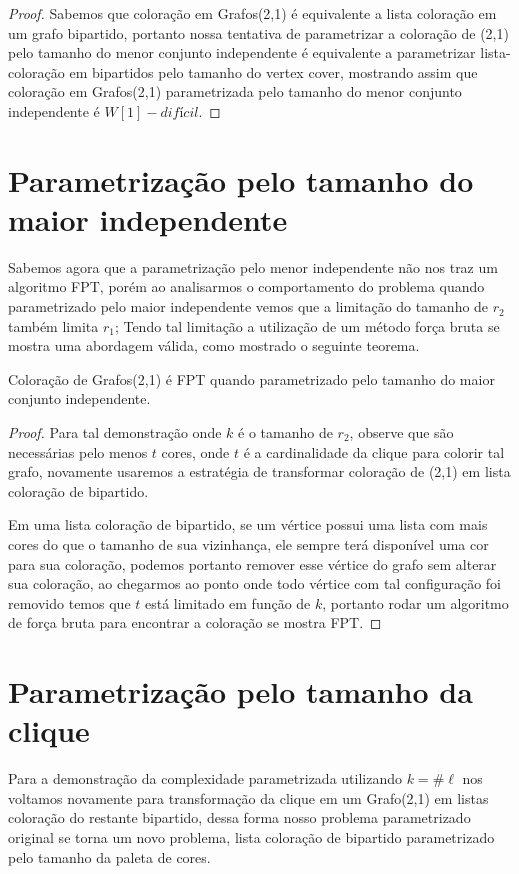 \begin{proof}
	Sabemos que coloração em Grafos(2,1) é equivalente a lista coloração em um grafo bipartido, portanto nossa tentativa de parametrizar a coloração de (2,1) pelo tamanho do menor conjunto independente é equivalente a parametrizar lista-coloração em bipartidos pelo tamanho do vertex cover, mostrando assim que coloração em Grafos(2,1) parametrizada pelo tamanho do menor conjunto independente é $W[1]-difícil$. 
	
\end{proof}

\section{Parametrização pelo tamanho do maior independente}

 Sabemos agora que a parametrização pelo menor independente não nos traz um algoritmo FPT, porém ao analisarmos o comportamento do problema quando parametrizado pelo maior independente vemos que a limitação do tamanho de $r_2$ também limita $r_1$; Tendo tal limitação a utilização de um método força bruta se mostra uma abordagem válida, como mostrado o seguinte teorema.
\begin{teorema}
  Coloração de Grafos(2,1) é FPT quando parametrizado pelo tamanho do maior conjunto independente.
\end{teorema}
\begin{proof}
  Para tal demonstração onde $k$ é o tamanho de $r_2$, observe que são necessárias pelo menos $t$ cores, onde $t$ é a cardinalidade da clique para colorir tal grafo, novamente usaremos a estratégia de transformar coloração de (2,1) em lista coloração de bipartido.
  
  Em uma lista coloração de bipartido, se um vértice possui uma lista com mais cores do que o tamanho de sua vizinhança, ele sempre terá disponível uma cor para sua coloração, podemos portanto remover esse vértice do grafo sem alterar sua coloração, ao chegarmos ao ponto onde todo vértice com tal configuração foi removido temos que $t$ está limitado em função de $k$, portanto rodar um algoritmo de força bruta para encontrar a coloração se mostra FPT.     
\end{proof}

\section{Parametrização pelo tamanho da clique}

Para a demonstração da complexidade parametrizada utilizando $k=\#\ell$ nos voltamos novamente para transformação da clique em um Grafo(2,1) em listas coloração do restante bipartido, dessa forma nosso problema parametrizado original se torna um novo problema, lista coloração de bipartido parametrizado pelo tamanho da paleta de cores. 

